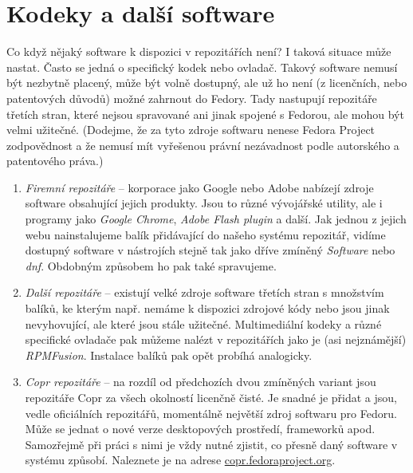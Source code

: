 \section*{Kodeky a další software}
Co když nějaký software k dispozici v repozitářích není? I taková situace může nastat. Často se jedná o specifický kodek nebo ovladač. Takový software nemusí být nezbytně placený, může být volně dostupný, ale už ho není (z licenčních, nebo patentových důvodů) možné zahrnout do Fedory. Tady nastupují repozitáře třetích stran, které nejsou spravované ani jinak spojené s Fedorou, ale mohou být velmi užitečné. (Dodejme, že za tyto zdroje softwaru nenese Fedora Project zodpovědnost a že nemusí mít vyřešenou právní nezávadnost podle autorského a patentového práva.)

\begin{enumerate}
\item \emph{Firemní repozitáře} -- korporace jako Google nebo Adobe nabízejí zdroje software obsahující jejich produkty. Jsou to různé vývojářské utility, ale i programy jako \emph{Google Chrome}, \emph{Adobe Flash plugin} a další. Jak jednou z jejich webu nainstalujeme balík přidávající do našeho systému repozitář, vidíme dostupný software v nástrojích stejně tak jako dříve zmíněný \emph{Software} nebo \emph{dnf}. Obdobným způsobem ho pak také spravujeme.

\item \emph{Další repozitáře} -- existují velké zdroje software třetích stran s množstvím balíků, ke kterým např. nemáme k dispozici zdrojové kódy nebo jsou jinak nevyhovující, ale které jsou stále užitečné. Multimediální kodeky a různé specifické ovladače pak můžeme nalézt v repozitářích jako je (asi nejznámější) \emph{RPMFusion}. Instalace balíků pak opět probíhá analogicky.

\item \emph{Copr repozitáře} -- na rozdíl od předchozích dvou zmíněných variant jsou repozitáře Copr za všech okolností licenčně čisté. Je snadné je přidat a jsou, vedle oficiálních repozitářů, momentálně největší zdroj softwaru pro Fedoru. Může se jednat o nové verze desktopových prostředí, frameworků apod. Samozřejmě při práci s nimi je vždy nutné zjistit, co přesně daný software v systému způsobí. Naleznete je na adrese \url{copr.fedoraproject.org}.

\end{enumerate}
